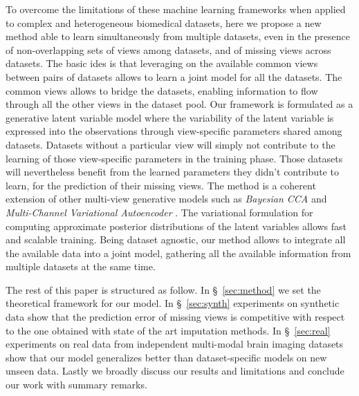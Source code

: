To overcome the limitations of these machine learning frameworks when applied to complex and heterogeneous biomedical datasets, here we propose a new method able to learn simultaneously from multiple datasets, even in the presence of non-overlapping sets of views among datasets, and of missing views across datasets.
The basic ides is that leveraging on the available common views between pairs of datasets allows to learn a joint model for all the datasets.
The common views allows to bridge the datasets, enabling information to flow through all the other views in the dataset pool.
Our framework  is formulated as a generative latent variable model where the variability of the latent variable is expressed into the observations through view-specific parameters shared among datasets.
Datasets without a particular view will simply not contribute to the learning of those view-specific parameters in the training phase.
Those datasets will nevertheless benefit from the learned parameters they didn't contribute to learn, for the prediction of their missing views.
The method is a coherent extension of other multi-view generative models such as \textit{Bayesian CCA} \citep{ Klami2013} and \textit{Multi-Channel Variational Autoencoder} \citep{Antelmi2019}.
The variational formulation for computing approximate posterior distributions of the latent variables allows fast and scalable training.
Being dataset agnostic, our method allows to integrate all the available data into a joint model, gathering  all the available information from multiple datasets at the same time.

The rest of this paper is structured as follow.
In \S~\ref{sec:method} we set the theoretical framework for our model.
In \S~\ref{sec:synth} experiments on synthetic data show that the prediction error of missing views is competitive with respect to the one obtained with state of the art imputation methods.
In \S~\ref{sec:real} experiments on real data from independent multi-modal brain imaging datasets show that our model generalizes better than dataset-specific models on new unseen data.
Lastly we broadly discuss our results and limitations and conclude our work with summary remarks.
